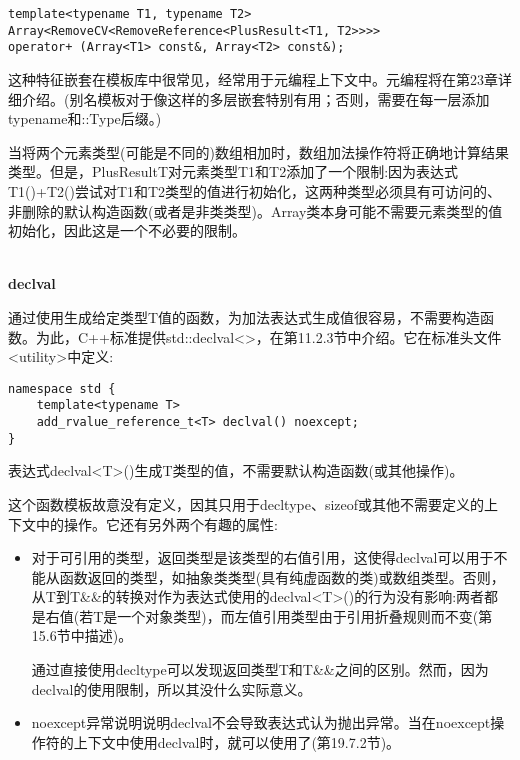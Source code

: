 \begin{lstlisting}[style=styleCXX]
template<typename T1, typename T2>
Array<RemoveCV<RemoveReference<PlusResult<T1, T2>>>>
operator+ (Array<T1> const&, Array<T2> const&);
\end{lstlisting}

这种特征嵌套在模板库中很常见，经常用于元编程上下文中。元编程将在第23章详细介绍。(别名模板对于像这样的多层嵌套特别有用；否则，需要在每一层添加typename和::Type后缀。)

当将两个元素类型(可能是不同的)数组相加时，数组加法操作符将正确地计算结果类型。但是，PlusResultT对元素类型T1和T2添加了一个限制:因为表达式T1()+T2()尝试对T1和T2类型的值进行初始化，这两种类型必须具有可访问的、非删除的默认构造函数(或者是非类类型)。Array类本身可能不需要元素类型的值初始化，因此这是一个不必要的限制。

\hspace*{\fill} \\ %
\noindent
\textbf{declval}

通过使用生成给定类型T值的函数，为加法表达式生成值很容易，不需要构造函数。为此，C++标准提供std::declval<>，在第11.2.3节中介绍。它在标准头文件<utility>中定义:

\begin{lstlisting}[style=styleCXX]
namespace std {
	template<typename T>
	add_rvalue_reference_t<T> declval() noexcept;
}
\end{lstlisting}

表达式declval<T>()生成T类型的值，不需要默认构造函数(或其他操作)。

这个函数模板故意没有定义，因其只用于decltype、sizeof或其他不需要定义的上下文中的操作。它还有另外两个有趣的属性:

\begin{itemize}
\item 
对于可引用的类型，返回类型是该类型的右值引用，这使得declval可以用于不能从函数返回的类型，如抽象类类型(具有纯虚函数的类)或数组类型。否则，从T到T\&\&的转换对作为表达式使用的declval<T>()的行为没有影响:两者都是右值(若T是一个对象类型)，而左值引用类型由于引用折叠规则而不变(第15.6节中描述)。

\begin{tcolorbox}[colback=webgreen!5!white,colframe=webgreen!75!black]
\hspace*{0.75cm}通过直接使用decltype可以发现返回类型T和T\&\&之间的区别。然而，因为declval的使用限制，所以其没什么实际意义。
\end{tcolorbox}

\item 
noexcept异常说明说明declval不会导致表达式认为抛出异常。当在noexcept操作符的上下文中使用declval时，就可以使用了(第19.7.2节)。
\end{itemize}

